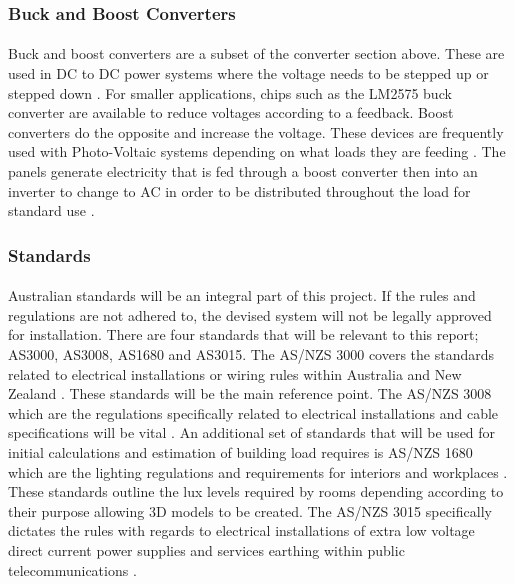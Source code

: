 \subsubsection{Buck and Boost Converters}

\paragraph{}
Buck and boost converters are a subset of the converter section above. These are used in DC to DC power systems where the voltage needs to be stepped up or stepped down \cite{textbook:Abu-Rub2014}. For smaller applications, chips such as the LM2575 buck converter are available to reduce voltages according to a feedback. Boost converters do the opposite and increase the voltage. These devices are frequently used with Photo-Voltaic systems depending on what loads they are feeding \cite{textbook:Abu-Rub2014}. The panels generate electricity that is fed through a boost converter then into an inverter to change to AC in order to be distributed throughout the load for standard use \cite{textbook:Abu-Rub2014}.     


\subsubsection{Standards}

\paragraph{}
Australian standards will be an integral part of this project. If the rules and regulations are not adhered to, the devised system will not be legally approved for installation. There are four standards that will be relevant to this report; AS3000, AS3008, AS1680 and AS3015. The AS/NZS 3000 covers the standards related to electrical installations or wiring rules within Australia and New Zealand \cite{StandardsAustralia2007}. These standards will be the main reference point. The AS/NZS 3008 which are the regulations specifically related to electrical installations and cable specifications will be vital \cite{StandardsAustralia2010}. An additional set of standards that will be used for initial calculations and estimation of building load requires is AS/NZS 1680 which are the lighting regulations and requirements for interiors and workplaces \cite{StandardsAustralia2006_2}. These standards outline the lux levels required by rooms depending according to their purpose allowing 3D models to be created. The AS/NZS 3015 specifically dictates the rules with regards to electrical installations of extra low voltage direct current power supplies and services earthing within public telecommunications \cite{StandardsAustralia2004}.     


